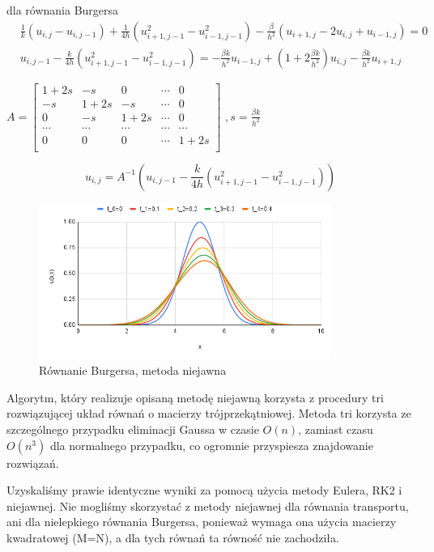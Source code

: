 \documentclass[a4paper,12pt]{article}
\begin{document}
dla równania Burgersa
\begin{equation}
\begin{split}
& \frac{1}{k}(u_{i,j}-u_{i,j-1})+\frac{1}{4h}(u_{i+1,j-1}^{2}-u_{i-1,j-1}^{2})-\frac{\beta}{h^{2}}(u_{i+1,j}-2u_{i,j}+u_{i-1,j})=0\\
& u_{i,j-1}-\frac{k}{4h}(u_{i+1,j-1}^{2}-u_{i-1,j-1}^{2})=-\frac{\beta k}{h^{2}}u_{i-1,j}+(1+2\frac{\beta k}{h^{2}})u_{i,j}-\frac{\beta k}{h^{2}}u_{i+1,j}
\end{split}
\end{equation}
\begin{center}
$A=
\begin{bmatrix}
1+2s & -s & 0 & \cdots & 0\\
-s & 1+2s & -s & \cdots & 0\\
0 & -s & 1+2s & \cdots & 0\\
\cdots & \cdots & \cdots & \cdots & \cdots\\
0 & 0 & 0 & \cdots & 1+2s\\
\end{bmatrix}$
$,s=\frac{\beta k}{h^{2}}$
\end{center}
\begin{equation}
u_{i,j}=A^{-1}(u_{i,j-1}-\frac{k}{4h}(u_{i+1,j-1}^{2}-u_{i-1,j-1}^{2}))
\end{equation}
\begin{figure}[h]
\caption{Równanie Burgersa, metoda niejawna}
\centering
\includegraphics[width=0.85\textwidth]{rys/9.png}
\end{figure}
\newline
Algorytm, który realizuje opisaną metodę niejawną korzysta z procedury tri rozwiązującej układ równań o macierzy trójprzekątniowej. Metoda tri korzysta ze szczególnego przypadku eliminacji Gaussa w czasie $O(n)$, zamiast czasu $O(n^3)$ dla normalnego przypadku, co ogromnie przyspiesza znajdowanie rozwiązań.
\newpage

Uzyskaliśmy prawie identyczne wyniki za pomocą użycia metody Eulera, RK2 i niejawnej. Nie mogliśmy skorzystać z metody niejawnej dla równania transportu, ani dla nielepkiego równania Burgersa, ponieważ wymaga ona użycia macierzy kwadratowej (M=N), a dla tych równań ta równość nie zachodziła.\\
\end{document}

